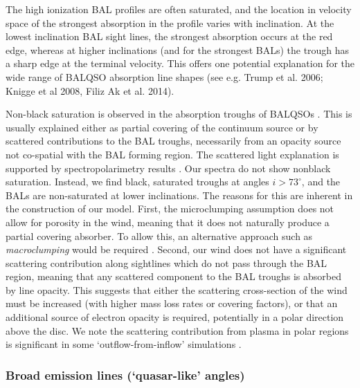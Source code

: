 \documentclass[useAMS,usenatbib]{mn2e_x}
\begin{document}
The high ionization BAL profiles are often saturated, and the location in velocity space
of the strongest absorption in the profile varies with inclination.
At the lowest inclination BAL sight lines, the strongest absorption occurs at the red edge,
whereas at higher inclinations (and for the strongest BALs)
the trough has a sharp edge at the terminal velocity.
This offers one potential explanation for the wide range of BALQSO absorption
line shapes (see e.g. Trump et al. 2006; Knigge et al 2008, Filiz Ak et al. 2014).

Non-black saturation is observed in the absorption troughs of BALQSOs \citep{arav1999b,arav1999a}.
This is usually explained either as  partial covering of the continuum
source or by scattered contributions to the BAL troughs, necessarily
from an opacity source not co-spatial with the BAL forming region.
The scattered light explanation is supported by spectropolarimetry results
\citep{lamy2000}. Our spectra do not show nonblack saturation.
Instead, we find black, saturated troughs at angles $i > 73^\circ$, and the BALs
are non-saturated at lower inclinations. The reasons for this are inherent in the construction of our model. 
First, the microclumping assumption does not allow for 
porosity in the wind, meaning that it does not naturally produce
a partial covering absorber. To allow this, an alternative approach
such as {\em macroclumping} would be required \citep[e.g.][]{hamann2008,surlan2012}.
Second, our wind does not have a significant scattering contribution 
along sightlines which do not pass through the BAL region,
meaning that any scattered component to the BAL troughs is absorbed by line opacity.
This suggests that either the scattering cross-section of the wind must
be increased (with higher mass loss rates or covering factors), or 
that an additional source of electron opacity is required, potentially
in a polar direction above the disc. We note the scattering contribution
from plasma in polar regions is significant in some `outflow-from-inflow'
simulations \citep{KP09, simproga2012}.

\subsubsection{Broad emission lines (`quasar-like' angles)}
\end{document}
